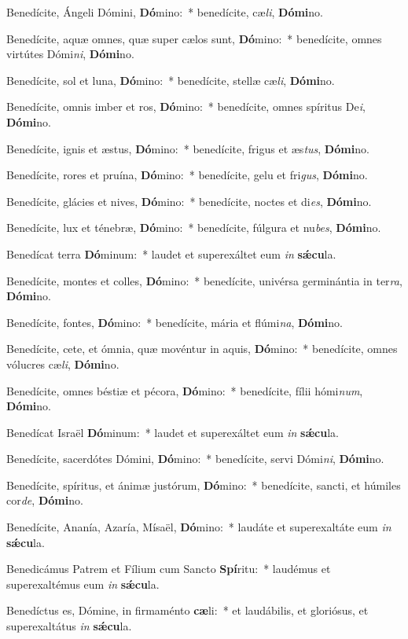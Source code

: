 \item Benedícite, Ángeli Dómini, \textbf{Dó}mino:~* benedícite, cæ\textit{li}, \textbf{Dó}\textbf{mi}no.
\item Benedícite, aquæ omnes, quæ super cælos sunt, \textbf{Dó}mino:~* benedícite, omnes virtútes Dómi\textit{ni}, \textbf{Dó}\textbf{mi}no.
\item Benedícite, sol et luna, \textbf{Dó}mino:~* benedícite, stellæ cæ\textit{li}, \textbf{Dó}\textbf{mi}no.
\item Benedícite, omnis imber et ros, \textbf{Dó}mino:~* benedícite, omnes spíritus De\textit{i}, \textbf{Dó}\textbf{mi}no.
\item Benedícite, ignis et æstus, \textbf{Dó}mino:~* benedícite, frigus et æs\textit{tus}, \textbf{Dó}\textbf{mi}no.
\item Benedícite, rores et pruína, \textbf{Dó}mino:~* benedícite, gelu et fri\textit{gus}, \textbf{Dó}\textbf{mi}no.
\item Benedícite, glácies et nives, \textbf{Dó}mino:~* benedícite, noctes et di\textit{es}, \textbf{Dó}\textbf{mi}no.
\item Benedícite, lux et ténebræ, \textbf{Dó}mino:~* benedícite, fúlgura et nu\textit{bes}, \textbf{Dó}\textbf{mi}no.
\item Benedícat terra \textbf{Dó}minum:~* laudet et superexáltet eum \textit{in} \textbf{sǽ}\textbf{cu}la.
\item Benedícite, montes et colles, \textbf{Dó}mino:~* benedícite, univérsa germinántia in ter\textit{ra}, \textbf{Dó}\textbf{mi}no.
\item Benedícite, fontes, \textbf{Dó}mino:~* benedícite, mária et flúmi\textit{na}, \textbf{Dó}\textbf{mi}no.
\item Benedícite, cete, et ómnia, quæ movéntur in aquis, \textbf{Dó}mino:~* benedícite, omnes vólucres cæ\textit{li}, \textbf{Dó}\textbf{mi}no.
\item Benedícite, omnes béstiæ et pécora, \textbf{Dó}mino:~* benedícite, fílii hómi\textit{num}, \textbf{Dó}\textbf{mi}no.
\item Benedícat Israël \textbf{Dó}minum:~* laudet et superexáltet eum \textit{in} \textbf{sǽ}\textbf{cu}la.
\item Benedícite, sacerdótes Dómini, \textbf{Dó}mino:~* benedícite, servi Dómi\textit{ni}, \textbf{Dó}\textbf{mi}no.
\item Benedícite, spíritus, et ánimæ justórum, \textbf{Dó}mino:~* benedícite, sancti, et húmiles cor\textit{de}, \textbf{Dó}\textbf{mi}no.
\item Benedícite, Ananía, Azaría, Mísaël, \textbf{Dó}mino:~* laudáte et superexaltáte eum \textit{in} \textbf{sǽ}\textbf{cu}la.
\item Benedicámus Patrem et Fílium cum Sancto \textbf{Spí}ritu:~* laudémus et superexaltémus eum \textit{in} \textbf{sǽ}\textbf{cu}la.
\item Benedíctus es, Dómine, in firmaménto \textbf{cæ}li:~* et laudábilis, et gloriósus, et superexaltátus \textit{in} \textbf{sǽ}\textbf{cu}la.
